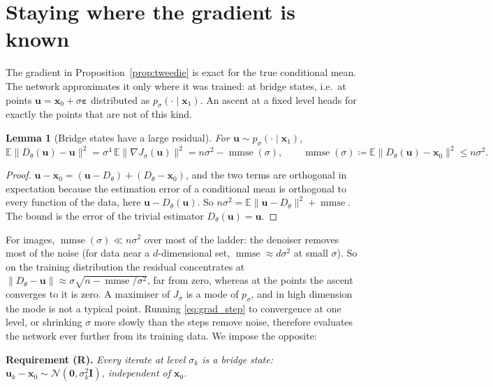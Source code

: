 \documentclass[11pt]{article}
\newtheorem{lemma}[proposition]{Lemma}
\theoremstyle{definition}
\theoremstyle{remark}
\newcommand{\x}{\bm{x}}
\newcommand{\uu}{\bm{u}}
\newcommand{\eps}{\bm{\varepsilon}}
\newcommand{\E}{\mathbb{E}}
\newcommand{\N}{\mathcal{N}}
\newcommand{\Id}{\bm{I}}
\newcommand{\D}{D_\theta}
\newcommand{\grad}{\nabla}
\newcommand{\mmse}{\operatorname{mmse}}
\begin{document}
\section{Staying where the gradient is known}\label{sec:typical}

The gradient in Proposition~\ref{prop:tweedie} is exact for the true conditional mean. The
network approximates it only where it was trained: at bridge states, i.e.\ at points
$\uu = \x_0 + \sigma\eps$ distributed as $p_\sigma(\cdot\mid\x_1)$. An ascent at a fixed level
heads for exactly the points that are not of this kind.

\begin{lemma}[Bridge states have a large residual]\label{lem:residual}
For $\uu\sim p_\sigma(\cdot\mid\x_1)$,
\begin{equation}
  \E\|\D(\uu) - \uu\|^2 = \sigma^4\,\E\|\grad J_\sigma(\uu)\|^2 = n\sigma^2 - \mmse(\sigma),
  \qquad \mmse(\sigma) \coloneqq \E\|\D(\uu) - \x_0\|^2 \le n\sigma^2 .
  \label{eq:residual}
\end{equation}
\end{lemma}
\begin{proof}
$\uu - \x_0 = (\uu - \D) + (\D - \x_0)$, and the two terms are orthogonal in expectation
because the estimation error of a conditional mean is orthogonal to every function of the
data, here $\uu - \D(\uu)$. So $n\sigma^2 = \E\|\uu-\D\|^2 + \mmse$. The bound is the error
of the trivial estimator $\D(\uu) = \uu$.
\end{proof}

For images, $\mmse(\sigma)\ll n\sigma^2$ over most of the ladder: the denoiser removes most
of the noise (for data near a $d$-dimensional set, $\mmse\approx d\sigma^2$ at small $\sigma$).
So on the training distribution the residual concentrates at
$\|\D-\uu\|\approx\sigma\sqrt{n - \mmse/\sigma^2}$, far from zero, whereas at the points the
ascent converges to it is zero. A maximiser of $J_\sigma$ is a mode of $p_\sigma$, and in high
dimension the mode is not a typical point. Running \eqref{eq:grad_step} to convergence at one
level, or shrinking $\sigma$ more slowly than the steps remove noise, therefore evaluates the
network ever further from its training data. We impose the opposite:

\smallskip
\noindent\textbf{Requirement (R).} \emph{Every iterate at level $\sigma_k$ is a bridge state:
$\uu_k - \x_0 \sim \N(\bm0,\sigma_k^2\Id)$, independent of $\x_0$.}
\smallskip
\end{document}
